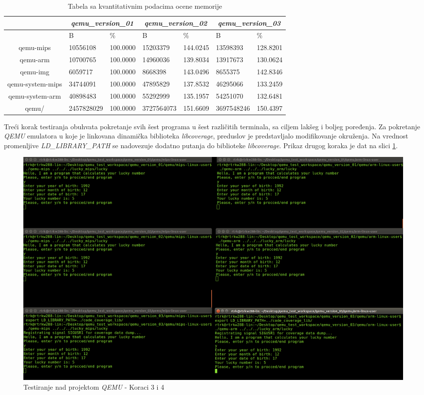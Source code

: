 \documentclass[12pt,oneside]{memoir}
\newcommand{\strano}[1]{\textit{#1}}
\begin{document}
\begin{table}
\caption{Tabela sa kvantitativnim podacima ocene memorije}
\label{tabela}
\begin{tabular}{ |p{1.9cm}|p{1.5cm}|p{1.9cm}|p{1.5cm}|p{1.9cm}|p{1.5cm}|p{1.9cm}|p{1.5cm} | }
 \hline
  \multicolumn{2}{|c|}{   } & \multicolumn{2}{|c|}{\strano{qemu\_version\_01}} &	\multicolumn{2}{|c|}{\strano{qemu\_version\_02}}	& \multicolumn{2}{|c|}{\strano{qemu\_version\_03}} \\
 \hline
 \multicolumn{2}{|c|}{   } &  B & \% &  B & \%  & B & \% \\
 \hline
 \multicolumn{2}{|c|}{qemu-mips} & 10556108 & 100.0000 & 15203379 & 144.0245 & 13598393	& 128.8201 \\
 \hline
 \multicolumn{2}{|c|}{qemu-arm} & 10700765 & 100.0000 & 14960036 & 139.8034 & 13917673 & 130.0624 \\
 \hline
\multicolumn{2}{|c|}{qemu-img} & 6059717 & 100.0000 & 8668398 & 143.0496 & 8655375 & 142.8346 \\
 \hline
  \multicolumn{2}{|c|}{qemu-system-mips} & 34744091 & 100.0000 & 47895829 & 137.8532 & 46295066 & 133.2459 \\
 \hline
  \multicolumn{2}{|c|}{qemu-system-arm} & 40898483 & 100.0000 & 55292999 & 135.1957 & 54251070 & 132.6481 \\
 \hline
  \multicolumn{2}{|c|}{qemu/} & 2457828029 & 100.0000 & 3727564073 & 151.6609 & 3697548246 & 150.4397 \\
 \hline

 
\end{tabular}
\end{table}


Treći korak testiranja obuhvata pokretanje svih šest programa u šest različitih terminala, sa ciljem lakšeg i boljeg poređenja.  Za pokretanje \strano{QEMU} emulatora u koje je linkovana dinamička biblioteka \strano{libcoverage}, preduslov je predstavljalo modifikovanje okruženja. Na vrednost promenljive \strano{LD\_LIBRARY\_PATH} se nadovezuje dodatno putanja do biblioteke \strano{libcoverage}. Prikaz drugog koraka je dat na slici \ref{fig:qemu-test-34}.


\begin{figure}[!ht]
  \centering
  \includegraphics[width=\textwidth]{img/qemu-test-23.png}
  \caption{Testiranje nad projektom \strano{QEMU} - Koraci 3 i 4}
  \label{fig:qemu-test-34}
\end{figure} 
\end{document}

